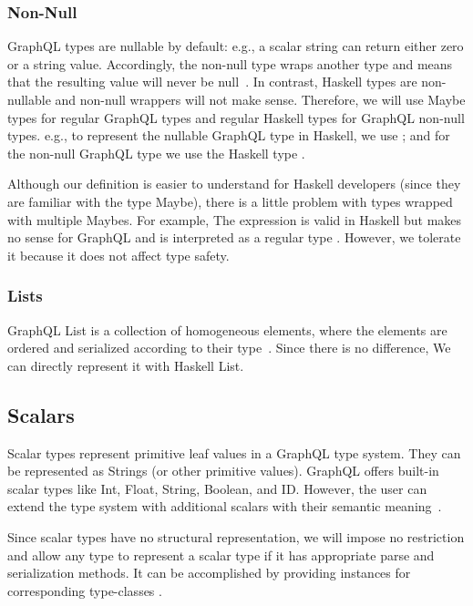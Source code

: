 \subsubsection{Non-Null}

GraphQL types are nullable by default: e.g., a scalar string can return either zero or a string value. Accordingly, the non-null type wraps another type and means that the resulting value will never be null~\cite{gql-spec}.
In contrast, Haskell types are non-nullable and non-null wrappers will not make sense. Therefore, we will use Maybe types for regular GraphQL types and regular Haskell types for GraphQL non-null types. e.g., to represent the nullable GraphQL type  in Haskell, we use ; and for the non-null GraphQL type  we use the Haskell type .

Although our definition is easier to understand for Haskell developers (since they are familiar with the type Maybe), there is a little problem with types wrapped with multiple Maybes. For example, The expression  is valid in Haskell but makes no sense for GraphQL and is interpreted as a regular type . However, we tolerate it because it does not affect type safety.

\subsubsection{Lists}

GraphQL List is a collection of homogeneous elements, where the elements are ordered and serialized according to their type~\cite{gql-spec}. Since there is no difference, We can directly represent it with Haskell List.

\subsection{Scalars}

Scalar types represent primitive leaf values in a GraphQL type system. They can be represented as Strings (or other primitive values). GraphQL offers built-in scalar types like Int, Float, String, Boolean, and ID. However, the user can extend the type system with additional scalars with their semantic meaning~\cite{gql-spec}.

Since scalar types have no structural representation, we will impose no restriction and allow any type to represent a scalar type if it has appropriate parse and serialization methods.
It can be accomplished by providing instances for corresponding type-classes .

